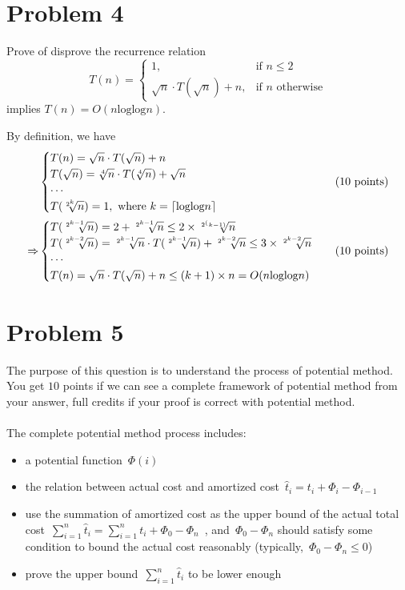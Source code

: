 \documentclass[a4paper]{article}
\DeclarePairedDelimiter{\ceil}{\lceil}{\rceil}
\begin{document}
\section{Problem 4}

Prove of disprove the recurrence relation
\begin{equation*}
T(n) = \begin{cases} 1, & \mbox{if } n \leq 2 \\ \sqrt{n} \cdot T(\sqrt{n}) + n, & \mbox{if } n\mbox{ otherwise} \end{cases} 
\end{equation*}
implies $T(n) = O(n\text{loglog}n)$.

By definition, we have
\begin{align*}
&
\begin{cases} 
T(n) = \sqrt{n} \cdot T(\sqrt{n}) + n \\ 
T(\sqrt{n}) = \sqrt[4]{n} \cdot T(\sqrt[4]{n}) + \sqrt{n}  \\ 
\cdots \\
T(\sqrt[2^k]{n}) = 1,\text{ where }k = \ceil{\text{loglog}n}
\end{cases}
&\text{(10 points)} \\
\Rightarrow
&
\begin{cases} 
T(\sqrt[2^{k-1}]{n}) = 2 + \sqrt[2^{k-1}]{n} \leq 2\times \sqrt[2^(k-1)]{n} \\ 
T(\sqrt[2^{k-2}]{n}) = \sqrt[2^{k-1}]{n} \cdot T(\sqrt[2^{k-1}]{n}) + \sqrt[2^{k-2}]{n} \leq 3\times \sqrt[2^{k-2}]{n}  \\ 
\cdots \\
T(n) = \sqrt{n} \cdot T(\sqrt{n}) + n \leq (k+1)\times n = O(n\text{loglog}n)
\end{cases}
&\text{(10 points)}
\end{align*}

\section{Problem 5}
The purpose of this question is to understand the process of potential method. You get $10$ points if we can see a complete framework of potential method from your answer, full credits if your proof is correct with potential method.\\\\

The complete potential method process includes:
\begin{itemize}

\item a potential function\ $\Phi(i)$
\item the relation between actual cost and amortized cost\ $\hat{t}_i = t_i+\Phi_i-\Phi_{i-1}$
\item use the summation of amortized cost as the upper bound of the actual total cost\ $\sum\limits_{i=1}^{n}\hat{t}_i=\sum\limits_{i=1}^{n}t_i+\Phi_0-\Phi_n$\ , and\ $\Phi_0-\Phi_n$ should satisfy some condition to bound the actual cost reasonably (typically,\ $\Phi_0-\Phi_n\leq 0$)
\item prove the upper bound\ $\sum\limits_{i=1}^{n}\hat{t}_i$ to be lower enough
\end{itemize}
\end{document}
